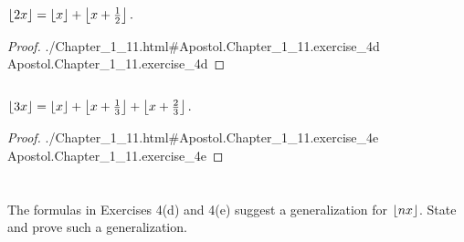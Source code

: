\documentclass{article}
\newcommand{\lean}[1]{\leanref
  {./Chapter\_1\_11.html\#Apostol.Chapter\_1\_11.#1}
  {Apostol.Chapter\_1\_11.#1}}
\begin{document}
\subsection*{}%
%

$\left\lfloor2x\right\rfloor = \left\lfloor x\right\rfloor + \left\lfloor x + \frac{1}{2}\right\rfloor.$

\begin{proof}

  \lean{exercise\_4d}

\end{proof}

\subsection*{}%
%

$\left\lfloor3x\right\rfloor = \left\lfloor x\right\rfloor + \left\lfloor x + \frac{1}{3}\right\rfloor + \left\lfloor x + \frac{2}{3}\right\rfloor.$

\begin{proof}

  \lean{exercise\_4e}

\end{proof}

\section*{}%
%

The formulas in Exercises 4(d) and 4(e) suggest a generalization for
  $\left\lfloor nx\right\rfloor$.
State and prove such a generalization.

\end{document}
